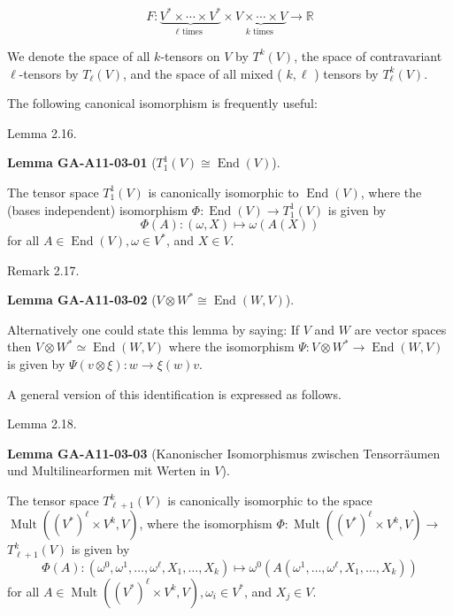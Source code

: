 \documentclass[10pt, letterpaper]{article}
\newcommand{\CustomHeading}[3]{%
  \par\medskip\noindent%
  \textbf{#1 #2} \textnormal{(#3)}.\enskip%
}
\newenvironment{LEM}[2]{\begin{unitbox}\CustomHeading{Lemma}{#1}{#2}}{\end{unitbox}}
\begin{document}
$$
F: \underbrace{V^{*} \times \cdots \times V^{*}}_{\ell \text { times }} \times \underbrace{V \times \cdots \times V}_{k \text { times }} \rightarrow \mathbb{R}
$$

We denote the space of all $k$-tensors on $V$ by $T^{k}(V)$, the space of contravariant $\ell$-tensors by $T_{\ell}(V)$, and the space of all mixed ( $k, \ell$ ) tensors by $T_{\ell}^{k}(V)$.


The following canonical isomorphism is frequently useful:



Lemma 2.16. 


\begin{LEM}{GA-A11-03-01}{$T_1^1(V)\cong \operatorname{End}(V)$}
The tensor space $T_{1}^{1}(V)$ is canonically isomorphic to $\operatorname{End}(V)$, where the (bases independent) isomorphism $\Phi: \operatorname{End}(V) \rightarrow T_{1}^{1}(V)$ is given by
$$
\Phi(A):(\omega, X) \mapsto \omega(A(X))
$$
for all $A \in \operatorname{End}(V), \omega \in V^{*}$, and $X \in V$.
\end{LEM}



Remark 2.17. 

\begin{LEM}{GA-A11-03-02}{$V \otimes W^{*} \cong \operatorname{End}(W, V)$}
Alternatively one could state this lemma by saying: If $V$ and $W$ are vector spaces then $V \otimes W^{*} \simeq \operatorname{End}(W, V)$ where the isomorphism $\Psi: V \otimes W^{*} \rightarrow \operatorname{End}(W, V)$ is given by $\Psi(v \otimes \xi): w \rightarrow \xi(w) v$.
\end{LEM}


A general version of this identification is expressed as follows.


Lemma 2.18. 

\begin{LEM}{GA-A11-03-03}{Kanonischer Isomorphismus zwischen Tensorräumen und Multilinearformen mit Werten in  $V$}
The tensor space $T_{\ell+1}^{k}(V)$ is canonically isomorphic to the space $\operatorname{Mult} ((V^{*})^{\ell} \times V^{k}, V)$, where the isomorphism $\Phi: \operatorname{Mult}\left(\left(V^{*}\right)^{\ell} \times V^{k}, V\right) \rightarrow$ $T_{\ell+1}^{k}(V)$ is given by
$$
\Phi(A):\left(\omega^{0}, \omega^{1}, \ldots, \omega^{\ell}, X_{1}, \ldots, X_{k}\right) \mapsto \omega^{0}\left(A\left(\omega^{1}, \ldots, \omega^{\ell}, X_{1}, \ldots, X_{k}\right)\right)
$$
for all $A \in \operatorname{Mult}\left(\left(V^{*}\right)^{\ell} \times V^{k}, V\right), \omega_{i} \in V^{*}$, and $X_{j} \in V$.
\end{LEM}
\end{document}
